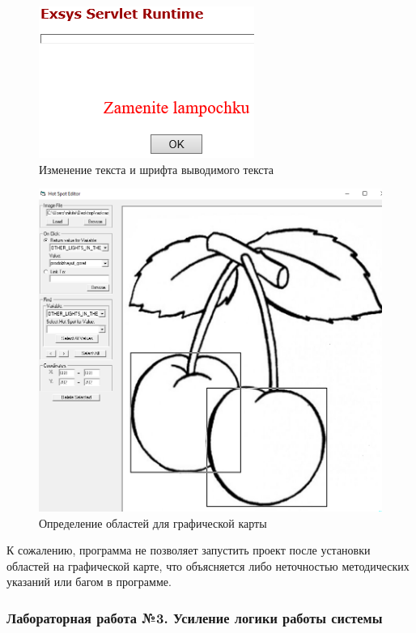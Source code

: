 \documentclass[14pt,a4paper,report]{report}
\begin{document}
\begin{figure}[h!]
	\centering
	\includegraphics[scale = 0.75]{images/2_1.png}
	\caption{Изменение текста и шрифта выводимого текста}
\end{figure}

\begin{figure}[h!]
	\centering
	\includegraphics[scale = 0.50]{images/2_2.png}
	\caption{Определение областей для графической карты}
\end{figure}

К сожалению, программа не позволяет запустить проект после установки областей на графической карте, что объясняется либо неточностью методических указаний или багом в программе.

\subsubsection{Лабораторная работа №3. Усиление логики работы системы}
\end{document}
